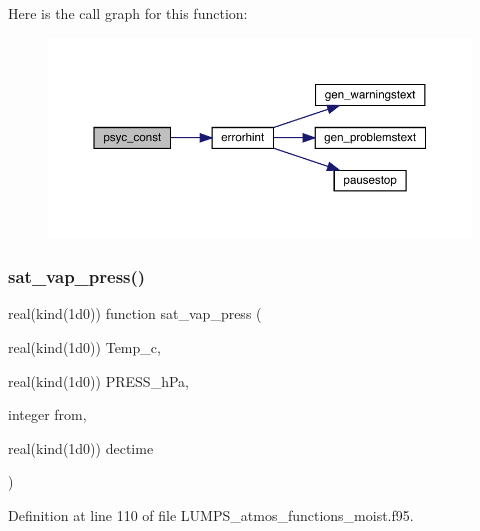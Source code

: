 Here is the call graph for this function\+:\nopagebreak
\begin{figure}[H]
\begin{center}
\leavevmode
\includegraphics[width=350pt]{_l_u_m_p_s__atmos__functions__moist_8f95_aca3cbb873a6638e6d630d35e0133d1dc_cgraph}
\end{center}
\end{figure}
\mbox{\label{_l_u_m_p_s__atmos__functions__moist_8f95_a634f4cc5a636b7b311a16a1eb64e133e}} 
\subsubsection{\texorpdfstring{sat\+\_\+vap\+\_\+press()}{sat\_vap\_press()}}
{\footnotesize\ttfamily real(kind(1d0)) function sat\+\_\+vap\+\_\+press (\begin{DoxyParamCaption}\item[{real(kind(1d0))}]{Temp\+\_\+c,  }\item[{real(kind(1d0))}]{P\+R\+E\+S\+S\+\_\+h\+Pa,  }\item[{integer}]{from,  }\item[{real(kind(1d0))}]{dectime }\end{DoxyParamCaption})}



Definition at line 110 of file L\+U\+M\+P\+S\+\_\+atmos\+\_\+functions\+\_\+moist.\+f95.

